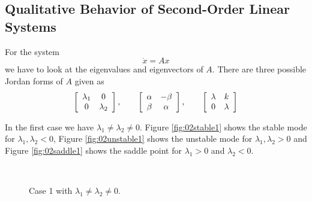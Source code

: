 \subsection{Qualitative Behavior of Second-Order Linear Systems}
For the system
$$\dot{x} = Ax$$
we have to look at the eigenvalues and eigenvectors of $A$. There are three possible Jordan forms of $A$ given as
\begin{align*}
\left[\begin{array}{c c} \lambda_1 & 0 \\ 0 & \lambda_2 \end{array}\right], \qquad
\left[\begin{array}{c c} \alpha & -\beta \\ \beta & \alpha \end{array}\right], \qquad
\left[\begin{array}{c c} \lambda & k \\ 0 & \lambda \end{array}\right]
\end{align*}

In the first case we have $\lambda_1\neq\lambda_2\neq0$. Figure \ref{fig:02stable1} shows the stable mode for $\lambda_1, \lambda_2<0$, Figure \ref{fig:02unstable1} shows the unstable mode for $\lambda_1, \lambda_2>0$ and Figure \ref{fig:02saddle1} shows the saddle point for $\lambda_1>0$ and $\lambda_2<0$.

\begin{figure}[ht!]
  \centering
   \hfill
   \\
  \caption{Case 1 with $\lambda_1\neq\lambda_2\neq0$.}
  \label{fig:02case1}
\end{figure}

